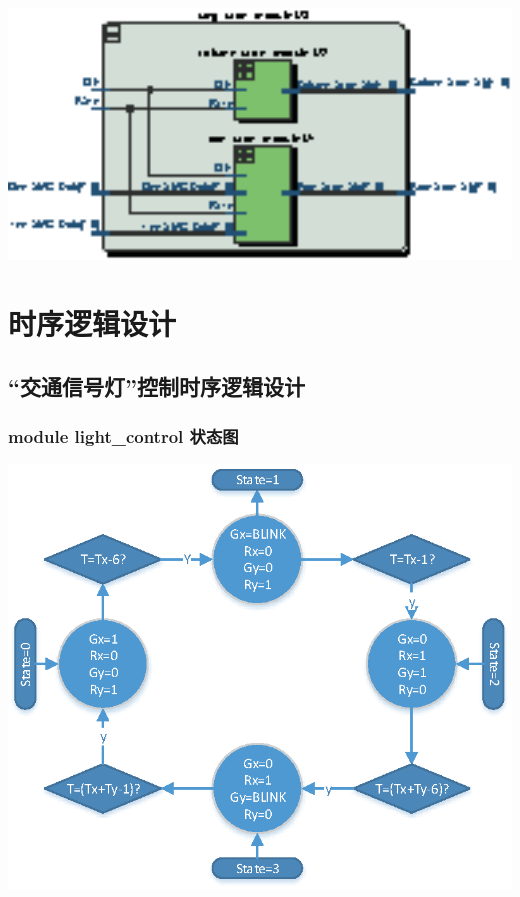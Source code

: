 \documentclass[12pt,a4paper]{article}
\begin{document}
			\begin{center}
				\includegraphics[width=15cm]{pic/pdf/smgscan.eps}
			\end{center}
	\section{时序逻辑设计}
	\subsection{“交通信号灯”控制时序逻辑设计}
		\subsubsection{module light\_control 状态图}
		\begin{center}
		\includegraphics[width=15cm]{pic/statemachine.eps}
		\end{center}
		
\end{document}
